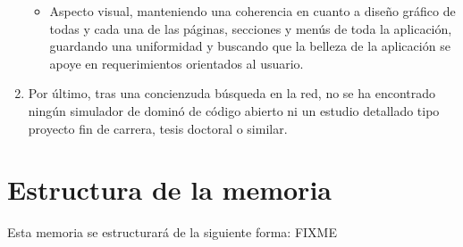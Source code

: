 \begin{enumerate}
\begin{itemize}
                \item Aspecto visual, manteniendo una coherencia en cuanto a diseño gráfico de todas
                        y cada una de las páginas, secciones y menús de toda la aplicación, guardando
                        una uniformidad y buscando que la belleza de la aplicación se apoye en
                        requerimientos orientados al usuario.
            \end{itemize}
    \item Por último, tras una concienzuda búsqueda en la red, no se
      ha encontrado ningún simulador de dominó de código abierto ni un
      estudio detallado tipo proyecto fin de carrera, tesis doctoral o
      similar.
\end{enumerate}

\section{Estructura de la memoria}

Esta memoria se estructurará de la siguiente forma: FIXME
